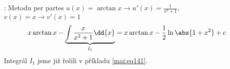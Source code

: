 \begin{mdframed}[style=mdmathsolution] 
  [\ref{mai:eq142}]: Metodu per partes \(u(x) =\arctan x \rightarrow u'(x) =\frac{1}{x^2+1}\),
  \(v(x)= x \rightarrow v'(x) = 1\)      
  \begin{gather*}
    x\arctan x-\underbrace{\int\frac{x}{x^2+1}\dd{x}}_{I_1} =
    x\arctan x-\frac{1}{2}\ln\abs{1+x^2}+ c 
  \end{gather*}
  Integrál \(I_1\) jsme již řešili v příkladu \ref{mai:eq141}.
\end{mdframed}